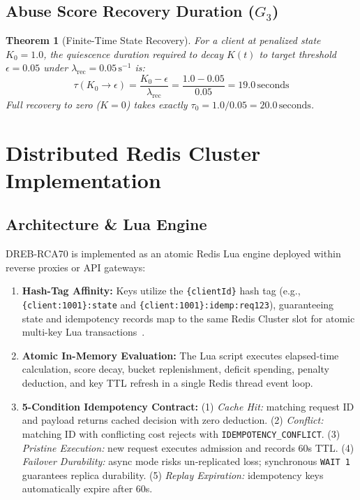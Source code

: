 \documentclass[conference]{IEEEtran}
\newtheorem{theorem}{Theorem}
\begin{document}
\subsection{Abuse Score Recovery Duration ($G_3$)}
\begin{theorem}[Finite-Time State Recovery]
For a client at penalized state $K_0 = 1.0$, the quiescence duration required to decay $K(t)$ to target threshold $\epsilon = 0.05$ under $\lambda_{\text{rec}} = 0.05\,\text{s}^{-1}$ is:
\begin{equation}
\tau(K_0 \to \epsilon) = \frac{K_0 - \epsilon}{\lambda_{\text{rec}}} = \frac{1.0 - 0.05}{0.05} = 19.0\,\text{seconds}
\end{equation}
Full recovery to zero ($K=0$) takes exactly $\tau_0 = 1.0 / 0.05 = 20.0\,\text{seconds}$.
\end{theorem}

\section{Distributed Redis Cluster Implementation}

\subsection{Architecture \& Lua Engine}
DREB-RCA70 is implemented as an atomic Redis Lua engine deployed within reverse proxies or API gateways:
\begin{enumerate}
    \item \textbf{Hash-Tag Affinity:} Keys utilize the \texttt{\{clientId\}} hash tag (e.g., \texttt{\{client:1001\}:state} and \texttt{\{client:1001\}:idemp:req123}), guaranteeing state and idempotency records map to the same Redis Cluster slot for atomic multi-key Lua transactions~\cite{redisclusterspec}.
    \item \textbf{Atomic In-Memory Evaluation:} The Lua script executes elapsed-time calculation, score decay, bucket replenishment, deficit spending, penalty deduction, and key TTL refresh in a single Redis thread event loop.
    \item \textbf{5-Condition Idempotency Contract:} (1) \textit{Cache Hit:} matching request ID and payload returns cached decision with zero deduction. (2) \textit{Conflict:} matching ID with conflicting cost rejects with \texttt{IDEMPOTENCY\_CONFLICT}. (3) \textit{Pristine Execution:} new request executes admission and records 60s TTL. (4) \textit{Failover Durability:} async mode risks un-replicated loss; synchronous \texttt{WAIT 1} guarantees replica durability. (5) \textit{Replay Expiration:} idempotency keys automatically expire after 60s.
\end{enumerate}
\end{document}
